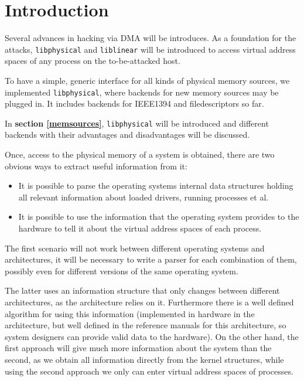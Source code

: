 %
%

\section{Introduction}

Several advances in hacking via DMA will be introduces. As a foundation for the
attacks, \texttt{libphysical} and \texttt{liblinear} will be introduced to
access virtual address spaces of any process on the to-be-attacked host.



To have a simple, generic interface for all kinds of physical memory sources, we
implemented \texttt{libphysical}, where backends for new memory sources may be
plugged in. It includes backends for IEEE1394 and filedescriptors so far.

In \textbf{section \ref{memsources}}, \texttt{libphysical} will be introduced
and different backends with their advantages and disadvantages will be
discussed.





Once, access to the physical memory of a system is obtained, there are two
obvious ways to extract useful information from it:

\begin{itemize}

	\item It is possible to parse the operating systems internal data
	structures holding all relevant information about loaded drivers,
	running processes et al.
	
	\item It is possible to use the information that the operating system
	provides to the hardware to tell it about the virtual address spaces of
	each process.
	
\end{itemize}

The first scenario will not work between different operating systems and
architectures, it will be necessary to write a parser for each combination of
them, possibly even for different versions of the same operating system.

The latter uses an information structure that only changes between different
architectures, as the architecture relies on it. Furthermore there is a well
defined algorithm for using this information (implemented in hardware in the
architecture, but well defined in the reference manuals for this architecture,
so system designers can provide valid data to the hardware). On the other hand,
the first approach will give much more information about the system than the
second, as we obtain all information directly from the kernel structures, while
using the second approach we only can enter virtual address spaces of processes.

